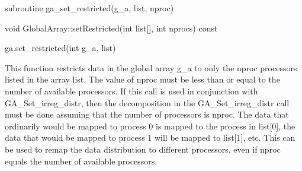 \documentclass[10pt]{article}
\begin{document}
\begin{fapi}
\begin{fcode}
subroutine ga_set_restricted(g_a, list, nproc)
\end{fcode}
\begin{funcargs}
\end{funcargs}
\end{fapi}

\begin{cxxapi}
\begin{cxxcode}
void GlobalArray::setRestricted(int list[], int nprocs) const
\end{cxxcode}
\begin{funcargs}
\end{funcargs}
\end{cxxapi}

\begin{pyapi}
\begin{pycode}
ga.set_restricted(int g_a, list)
\end{pycode}
\begin{funcargs}
\end{funcargs}
\end{pyapi}

\gcoll

\begin{desc}

This function restricts data in the global array g_a to only the nproc
processors listed in the array list. The value of nproc must be less than or
equal to the number of available processors. If this call is used in
conjunction with GA_Set_irreg_distr, then the decomposition in the
GA_Set_irreg_distr call must be done assuming that the number of processors is
nproc. The data that ordinarily would be mapped to process 0 is mapped to the
process in list[0], the data that would be mapped to process 1 will be mapped
to list[1], etc. This can be used to remap the data distribution to different
processors, even if nproc equals the number of available processors.

\end{desc}

\end{document}
